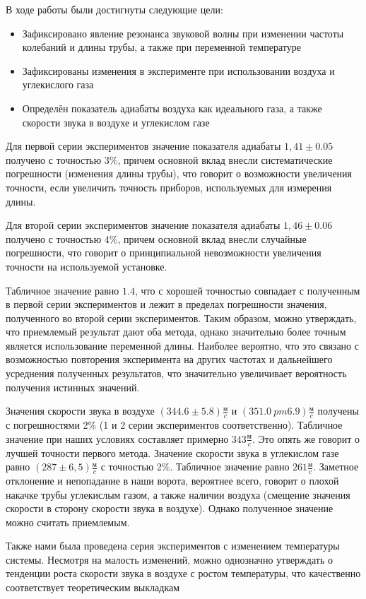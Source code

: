 \documentclass[12pt,a4paper]{article}
\begin{document}
В ходе работы были достигнуты следующие цели:
\begin{itemize}
\item Зафиксировано явление резонанса звуковой волны при изменении частоты колебаний и длины трубы, а также при переменной температуре
\item Зафиксированы изменения в эксперименте при использовании воздуха и углекислого газа
\item Определён показатель адиабаты воздуха как идеального газа, а также скорости звука в воздухе и углекислом газе
\end{itemize}


Для первой серии экспериментов значение показателя адиабаты $1,41 \pm 0.05$ получено с точностью 3\%, причем основной вклад внесли систематические погрешности (изменения длины трубы), что говорит о возможности увеличения точности, если увеличить точность приборов, используемых для измерения длины.

Для второй серии экспериментов значение показателя адиабаты $1,46 \pm 0.06$ получено с точностью 4\%, причем основной вклад внесли случайные погрешности, что говорит о принципиальной невозможности увеличения точности на используемой установке.

Табличное значение равно $1.4$, что с хорошей точностью совпадает с полученным в первой серии экспериментов и лежит в пределах погрешности значения, полученного во второй серии экспериментов. Таким образом, можно утверждать, что приемлемый результат дают оба метода, однако значительно более точным является использование переменной длины. Наиболее вероятно, что это связано с возможностью повторения эксперимента на других частотах и дальнейшего усреднения полученных результатов, что значительно увеличивает вероятность получения истинных значений.

Значения скорости звука в воздухе $(344.6 \pm 5.8) \frac{\text{м}}{c}$ и $(351.0 \ pm 6.9) \frac{\text{м}}{c}$ получены с погрешностями 2\% (1 и 2 серии экспериментов соответственно). Табличное значение при наших условиях составляет примерно $343 \frac{\text{м}}{c}$. Это опять же говорит о лучшей точности первого метода. Значение скорости звука в углекислом газе равно $(287 \pm 6,5) \frac{\text{м}}{c}$ с точностью 2\%. Табличное значение равно $261 \frac{\text{м}}{c}$. Заметное отклонение и непопадание в наши ворота, вероятнее всего, говорит о плохой накачке трубы углекислым газом, а также наличии воздуха (смещение значения скорости в сторону скорости звука в воздухе). Однако полученное значение можно считать приемлемым.

Также нами была проведена серия экспериментов с изменением температуры системы. Несмотря на малость изменений, можно однозначно утверждать о тенденции роста скорости звука в воздухе с ростом температуры, что качественно соответствует теоретическим выкладкам 
\end{document}

